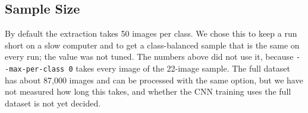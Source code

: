 \subsection{Sample Size}

By default the extraction takes 50 images per class. We chose this to keep a run short on a slow computer and to get a class-balanced sample that is the same on every run; the value was not tuned. The numbers above did not use it, because \texttt{-{}-max-per-class 0} takes every image of the 22-image sample. The full dataset has about 87,000 images and can be processed with the same option, but we have not measured how long this takes, and whether the CNN training uses the full dataset is not yet decided.